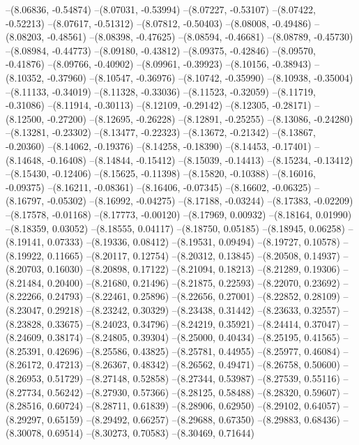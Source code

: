--(8.06836, -0.54874)
--(8.07031, -0.53994)
--(8.07227, -0.53107)
--(8.07422, -0.52213)
--(8.07617, -0.51312)
--(8.07812, -0.50403)
--(8.08008, -0.49486)
--(8.08203, -0.48561)
--(8.08398, -0.47625)
--(8.08594, -0.46681)
--(8.08789, -0.45730)
--(8.08984, -0.44773)
--(8.09180, -0.43812)
--(8.09375, -0.42846)
--(8.09570, -0.41876)
--(8.09766, -0.40902)
--(8.09961, -0.39923)
--(8.10156, -0.38943)
--(8.10352, -0.37960)
--(8.10547, -0.36976)
--(8.10742, -0.35990)
--(8.10938, -0.35004)
--(8.11133, -0.34019)
--(8.11328, -0.33036)
--(8.11523, -0.32059)
--(8.11719, -0.31086)
--(8.11914, -0.30113)
--(8.12109, -0.29142)
--(8.12305, -0.28171)
--(8.12500, -0.27200)
--(8.12695, -0.26228)
--(8.12891, -0.25255)
--(8.13086, -0.24280)
--(8.13281, -0.23302)
--(8.13477, -0.22323)
--(8.13672, -0.21342)
--(8.13867, -0.20360)
--(8.14062, -0.19376)
--(8.14258, -0.18390)
--(8.14453, -0.17401)
--(8.14648, -0.16408)
--(8.14844, -0.15412)
--(8.15039, -0.14413)
--(8.15234, -0.13412)
--(8.15430, -0.12406)
--(8.15625, -0.11398)
--(8.15820, -0.10388)
--(8.16016, -0.09375)
--(8.16211, -0.08361)
--(8.16406, -0.07345)
--(8.16602, -0.06325)
--(8.16797, -0.05302)
--(8.16992, -0.04275)
--(8.17188, -0.03244)
--(8.17383, -0.02209)
--(8.17578, -0.01168)
--(8.17773, -0.00120)
--(8.17969, 0.00932)
--(8.18164, 0.01990)
--(8.18359, 0.03052)
--(8.18555, 0.04117)
--(8.18750, 0.05185)
--(8.18945, 0.06258)
--(8.19141, 0.07333)
--(8.19336, 0.08412)
--(8.19531, 0.09494)
--(8.19727, 0.10578)
--(8.19922, 0.11665)
--(8.20117, 0.12754)
--(8.20312, 0.13845)
--(8.20508, 0.14937)
--(8.20703, 0.16030)
--(8.20898, 0.17122)
--(8.21094, 0.18213)
--(8.21289, 0.19306)
--(8.21484, 0.20400)
--(8.21680, 0.21496)
--(8.21875, 0.22593)
--(8.22070, 0.23692)
--(8.22266, 0.24793)
--(8.22461, 0.25896)
--(8.22656, 0.27001)
--(8.22852, 0.28109)
--(8.23047, 0.29218)
--(8.23242, 0.30329)
--(8.23438, 0.31442)
--(8.23633, 0.32557)
--(8.23828, 0.33675)
--(8.24023, 0.34796)
--(8.24219, 0.35921)
--(8.24414, 0.37047)
--(8.24609, 0.38174)
--(8.24805, 0.39304)
--(8.25000, 0.40434)
--(8.25195, 0.41565)
--(8.25391, 0.42696)
--(8.25586, 0.43825)
--(8.25781, 0.44955)
--(8.25977, 0.46084)
--(8.26172, 0.47213)
--(8.26367, 0.48342)
--(8.26562, 0.49471)
--(8.26758, 0.50600)
--(8.26953, 0.51729)
--(8.27148, 0.52858)
--(8.27344, 0.53987)
--(8.27539, 0.55116)
--(8.27734, 0.56242)
--(8.27930, 0.57366)
--(8.28125, 0.58488)
--(8.28320, 0.59607)
--(8.28516, 0.60724)
--(8.28711, 0.61839)
--(8.28906, 0.62950)
--(8.29102, 0.64057)
--(8.29297, 0.65159)
--(8.29492, 0.66257)
--(8.29688, 0.67350)
--(8.29883, 0.68436)
--(8.30078, 0.69514)
--(8.30273, 0.70583)
--(8.30469, 0.71644)

